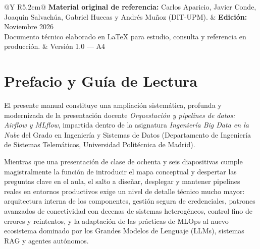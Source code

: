 \begin{titlepage}
\noindent\hspace*{0.2cm}\begin{minipage}{0.94\textwidth}
  \begin{tabularx}{\textwidth}{@{}Y R{5.2cm}@{}}
    {\sffamily\footnotesize\color{SlateText}\textbf{Material original de referencia:} Carlos Aparicio, Javier Conde, Joaquín Salvachúa, Gabriel Huecas y Andrés Muñoz (DIT-UPM).} &
    {\sffamily\footnotesize\color{PrimaryDark}\textbf{Edición:} Noviembre 2026}\\
    {\sffamily\footnotesize\color{MutedGray}Documento técnico elaborado en \LaTeX{} para estudio, consulta y referencia en producción.} &
    {\sffamily\footnotesize\color{MutedGray}Versión 1.0 --- A4}
  \end{tabularx}
\end{minipage}
\vspace*{0.1cm}
\end{titlepage}

\chapter*{Prefacio y Guía de Lectura}

El presente manual constituye una ampliación sistemática, profunda y modernizada de la presentación docente \textit{Orquestación y pipelines de datos: Airflow y MLflow}, impartida dentro de la asignatura \textit{Ingeniería Big Data en la Nube} del Grado en Ingeniería y Sistemas de Datos (Departamento de Ingeniería de Sistemas Telemáticos, Universidad Politécnica de Madrid).

Mientras que una presentación de clase de ochenta y seis diapositivas cumple magistralmente la función de introducir el mapa conceptual y despertar las preguntas clave en el aula, el salto a diseñar, desplegar y mantener pipelines reales en entornos productivos exige un nivel de detalle técnico mucho mayor: arquitectura interna de los componentes, gestión segura de credenciales, patrones avanzados de conectividad con decenas de sistemas heterogéneos, control fino de errores y reintentos, y la adaptación de las prácticas de MLOps al nuevo ecosistema dominado por los Grandes Modelos de Lenguaje (LLMs), sistemas RAG y agentes autónomos.

